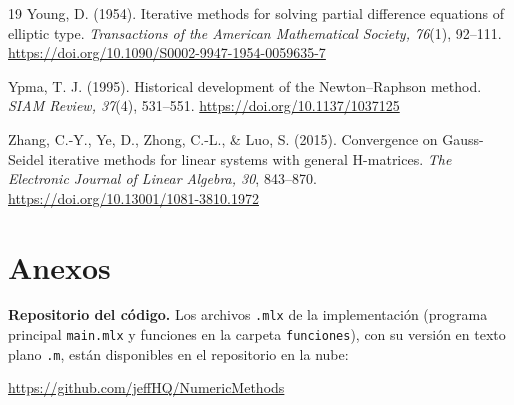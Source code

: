 \documentclass[final,5p,times,twocolumn,authoryear,11pt]{elsarticle}
\begin{document}
\begin{thebibliography}{19}
Young, D. (1954). Iterative methods for solving partial difference equations of elliptic type. \textit{Transactions of the American Mathematical Society, 76}(1), 92--111. \url{https://doi.org/10.1090/S0002-9947-1954-0059635-7}

Ypma, T. J. (1995). Historical development of the Newton--Raphson method. \textit{SIAM Review, 37}(4), 531--551. \url{https://doi.org/10.1137/1037125}

Zhang, C.-Y., Ye, D., Zhong, C.-L., \& Luo, S. (2015). Convergence on Gauss-Seidel iterative methods for linear systems with general H-matrices. \textit{The Electronic Journal of Linear Algebra, 30}, 843--870. \url{https://doi.org/10.13001/1081-3810.1972}

\end{thebibliography}

\clearpage
\section*{Anexos}
\textbf{Repositorio del código.} Los archivos \texttt{.mlx} de la implementación (programa principal \texttt{main.mlx} y funciones en la carpeta \texttt{funciones}), con su versión en texto plano \texttt{.m}, están disponibles en el repositorio en la nube:

\url{https://github.com/jeffHQ/NumericMethods}
\end{document}
